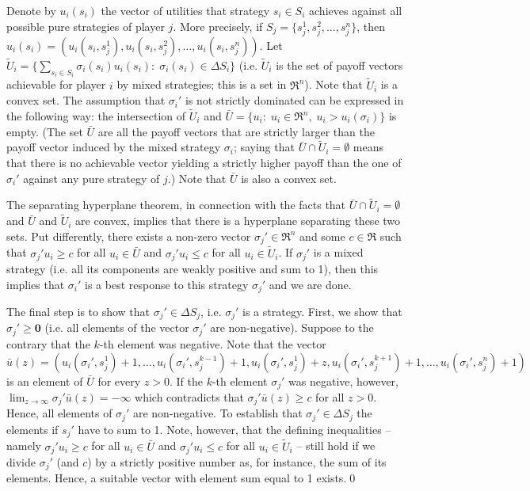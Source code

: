 \documentclass[a4paper,11pt]{article}
\begin{document}
Denote by $u_i(s_i)$ the vector of utilities that strategy $s_i\in S_i$ achieves against all possible pure strategies of player $j$. More precisely, if $S_j=\{s_j^1,s_j^2,\dots,s_j^n\}$, then $u_i(s_i)=(u_i(s_i,s_j^1),u_i(s_i,s_j^2),\dots,u_i(s_i,s_j^n))$. Let $\tilde{U}_i=\{\sum_{s_i\in S_i}\sigma_i(s_i) u_i(s_i):\;\sigma_i(s_i)\in\Delta S_i\}$ (i.e. $\tilde{U}_i$ is the set of payoff vectors achievable for player $i$ by mixed strategies; this is a set in $\Re^n$). Note that $\tilde{U}_i$ is a convex set. The assumption that $\sigma_i'$ is not strictly dominated can be expressed in the following way: the intersection of $\tilde{U}_i$ and $\bar{U}=\{ u_i:\;u_i\in\Re^n,\;u_i>u_i(\sigma_i)\}$ is empty. (The set $\bar{{U}}$ are all the payoff vectors that are strictly larger than the payoff vector induced by the mixed strategy $\sigma_i$; saying that $\bar{U}\cap\tilde{U}_i=\emptyset$ means that there is no achievable vector yielding a strictly higher payoff than the one of $\sigma_i'$  against any pure strategy of $j$.) Note that $\bar{U}$ is also a convex set.

The separating hyperplane theorem, in connection with the facts that $\bar{U}\cap\tilde{U}_i=\emptyset$ and $\bar{U}$ and $\tilde{U}_i$ are convex, implies that there is a hyperplane separating these two sets. Put differently, there exists a non-zero vector $\sigma_j'\in \Re^n$ and some $c\in \Re$ such that $\sigma_j' u_i\geq c$ for all $u_i\in \bar{U}$ and $\sigma_j'u_i\leq c$ for all $u_i\in\tilde{U}_i$. If $\sigma_j'$ is a mixed strategy (i.e. all its components are weakly positive and sum to 1), then this implies that $\sigma_i'$ is a best response to this strategy $\sigma_j'$ and we are done.

The final step is to show that $\sigma_j'\in\Delta S_j$, i.e. $\sigma_j'$ is a strategy. First, we show that $\sigma_j'\geq \mathbf{0}$ (i.e. all elements of the vector $\sigma_j'$ are non-negative). Suppose to the contrary that the $k$-th element was negative. Note that the vector $\bar u(z)=(u_i(\sigma_i',s_j^1)+1,\dots,u_i(\sigma_i',s_j^{k-1})+1,u_i(\sigma_i',s_j^1)+z,u_i(\sigma_i',s_j^{k+1})+1,\dots,u_i(\sigma_i',s_j^n)+1)$ is an element of $\bar{U}$ for every $z>0$. If the $k$-th element $\sigma_j'$ was negative, however, $\lim_{z\rightarrow\infty}\sigma_j' \bar u(z)=-\infty$ which contradicts that $\sigma_j'\bar u(z)\geq c$ for all $z>0$. Hence, all elements of $\sigma_j'$ are non-negative. To establish that $\sigma_j'\in \Delta S_j$ the elements if $s_j'$ have to sum to 1. Note, however, that the defining inequalities -- namely $\sigma_j' u_i\geq c$ for all $u_i\in \bar{U}$ and $\sigma_j'u_i\leq c$ for all $u_i\in\tilde{U}_i$ -- still hold if we divide $\sigma_j'$ (and $c$) by a strictly positive number as, for instance, the sum of its elements. Hence, a suitable vector with element sum equal to 1 exists.\qed
\end{document}
